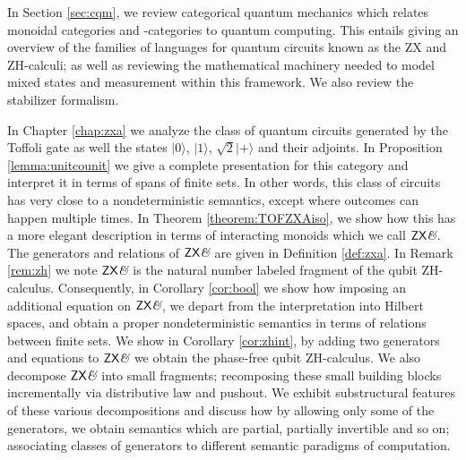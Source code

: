 In Section \ref{sec:cqm}, we review  categorical quantum mechanics which relates monoidal categories and \dag-categories to quantum computing. This entails giving an overview of the families of languages for quantum circuits known as the  ZX and ZH-calculi; as well as reviewing the mathematical machinery needed to model mixed states and measurement within this framework.  We also review the stabilizer formalism.

In Chapter \ref{chap:zxa} we analyze the class of quantum circuits generated by the Toffoli gate as well the states $|0\rangle$, $|1\rangle$, $\sqrt{2}|+\rangle$ and their adjoints.  In Proposition \ref{lemma:unitcounit} we give a complete presentation for this category and interpret it in terms of spans of finite sets.  In other words, this class of circuits has very close to a nondeterministic semantics, except where outcomes can happen multiple times.  In Theorem \ref{theorem:TOFZXAiso}, we show how this has a more elegant  description in terms of interacting monoids which we call $\mathsf{ZX}\textit{\&}$.  The generators and relations of $\mathsf{ZX}\textit{\&}$ are given in Definition \ref{def:zxa}.    In Remark \ref{rem:zh} we note $\mathsf{ZX}\textit{\&}$  is the natural number labeled fragment of the qubit ZH-calculus.  Consequently, in Corollary \ref{cor:bool} we show how  imposing an additional equation on $\mathsf{ZX}\textit{\&}$, we depart from the interpretation into Hilbert spaces, and obtain a proper  nondeterministic semantics in terms of relations between finite sets.  We show in Corollary \ref{cor:zhint}, by adding two generators and equations to $\mathsf{ZX}\textit{\&}$  we obtain the phase-free qubit ZH-calculus.
We also decompose $\mathsf{ZX}\textit{\&}$  into small fragments; recomposing these small building blocks incrementally via distributive law and pushout.
We exhibit substructural features of these various decompositions and discuss how by allowing only some of the generators, we obtain semantics which are partial, partially invertible and so on; associating classes of generators to different semantic paradigms of computation.


